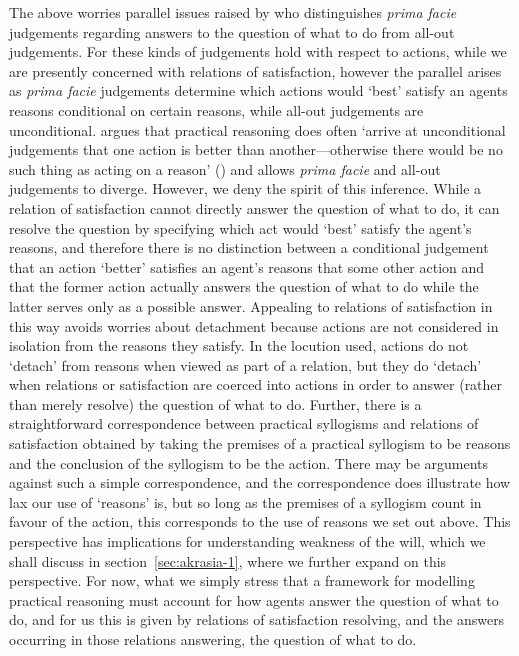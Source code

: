 \documentclass[10pt]{article}
\begin{document}
The above worries parallel issues raised by \textcite{Davidson:1969aa} who distinguishes \emph{prima facie} judgements regarding answers to the question of what to do from all-out judgements.
For \citeauthor{Davidson:1969aa} these kinds of judgements hold with respect to actions, while we are presently concerned with relations of satisfaction, however the parallel arises as \emph{prima facie} judgements determine which actions would `best' satisfy an agents reasons conditional on certain reasons, while all-out judgements are unconditional.
\citeauthor{Davidson:1969aa} argues that practical reasoning does often `arrive at unconditional judgements that one action is better than another---otherwise there would be no such thing as acting on a reason' (\citeyear[39]{Davidson:1969aa}) and allows \emph{prima facie} and all-out judgements to diverge.
However, we deny the spirit of this inference.
While a relation of satisfaction cannot directly answer the question of what to do, it can resolve the question by specifying which act would `best' satisfy the agent's reasons, and therefore there is no distinction between a conditional judgement that an action `better' satisfies an agent's reasons that some other action and that the former action actually answers the question of what to do while the latter serves only as a possible answer.
Appealing to relations of satisfaction in this way avoids worries about detachment because actions are not considered in isolation from the reasons they satisfy.
In the locution used, actions do not `detach' from reasons when viewed as part of a relation, but they do `detach' when relations or satisfaction are coerced into actions in order to answer (rather than merely resolve) the question of what to do.
Further, there is a straightforward correspondence between practical syllogisms and relations of satisfaction obtained by taking the premises of a practical syllogism to be reasons and the conclusion of the syllogism to be the action.
There may be arguments against such a simple correspondence, and the correspondence does illustrate how lax our use of `reasons' is, but so long as the premises of a syllogism count in favour of the action, this corresponds to the use of reasons we set out above.%
This perspective has implications for understanding weakness of the will, which we shall discuss in section~\ref{sec:akrasia-1}, where we further expand on this perspective.
For now, what we simply stress that a framework for modelling practical reasoning must account for how agents answer the question of what to do, and for us this is given by relations of satisfaction resolving, and the answers occurring in those relations answering, the question of what to do.
\end{document}
